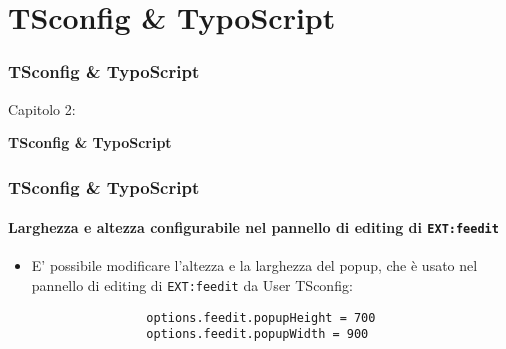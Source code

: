 %

\section{TSconfig \& TypoScript}
\begin{frame}[fragile]
	\frametitle{TSconfig \& TypoScript}

	\begin{center}\huge{Capitolo 2:}\end{center}
	\begin{center}\huge{\color{typo3darkgrey}\textbf{TSconfig \& TypoScript}}\end{center}

\end{frame}
 

\begin{frame}[fragile]
	\frametitle{TSconfig \& TypoScript}
	\framesubtitle{Larghezza e altezza configurabile nel pannello di editing di \texttt{EXT:feedit}}

	\lstset{basicstyle=\small\ttfamily}

	\begin{itemize}

		\item E' possibile modificare l'altezza e la larghezza del popup, che è usato nel pannello
			di editing di \texttt{EXT:feedit} da User TSconfig:
			\begin{lstlisting}
				options.feedit.popupHeight = 700
				options.feedit.popupWidth = 900
			\end{lstlisting}

	\end{itemize}

\end{frame}

